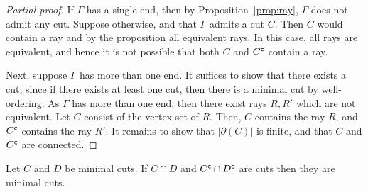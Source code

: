 \begin{proof}[Partial proof]
    If \(\Gamma\) has a single end, then by Proposition~\ref{prop:ray}, \(\Gamma\) does not admit any cut. Suppose otherwise, and that \(\Gamma\) admits a cut \(C\). Then \(C\) would contain a ray and by the proposition all equivalent rays. In this case, all rays are equivalent, and hence it is not possible that both \(C\) and \({C}^{\mathsf{c}}\) contain a ray.

    Next, suppose \(\Gamma\) has more than one end. It suffices to show that there exists a cut, since if there exists at least one cut, then there is a minimal cut by well-ordering. As \(\Gamma\) has more than one end, then there exist rays \(R, R'\) which are not equivalent. Let \(C\) consist of the vertex set of \(R\). Then, \(C\) contains the ray \(R\), and \({C}^{\mathsf{c}}\) contains the ray \(R'\). 
    It remains to show that \(|\partial(C)|\) is finite, and that \(C\) and \({C}^{\mathsf{c}}\) are connected.
\end{proof}

\begin{lemma}
\label{lem:mincuts}
    Let \(C\) and \(D\) be minimal cuts. If \(C \cap D\) and \({C}^{\mathsf{c}} \cap {D}^{\mathsf{c}}\) are cuts then
they are minimal cuts.
\end{lemma}

